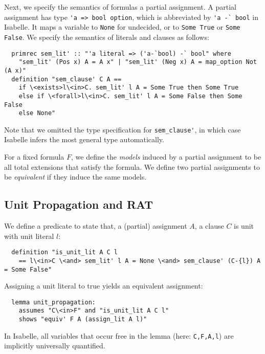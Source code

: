 \documentclass{llncs}
\newcommand{\isai}{\lstinline[language=isabelle,basicstyle=\normalsize\ttfamily\slshape]}
\begin{document}
Next, we specify the semantics of formulas \wrt a partial assignment. A partial assignment has 
type \isai{'a => bool option}, which is abbreviated by \isai{'a -` bool} in Isabelle. 
It maps a variable to \isai{None} for undecided, or to \isai{Some True} or \isai{Some False}.
We specify the semantics of literals and clauses as follows:
\begin{lstlisting}
  primrec sem_lit' :: "'a literal => ('a-`bool) -` bool" where
    "sem_lit' (Pos x) A = A x" | "sem_lit' (Neg x) A = map_option Not (A x)"
  definition "sem_clause' C A ==
    if \<exists>l\<in>C. sem_lit' l A = Some True then Some True
    else if \<forall>l\<in>C. sem_lit' l A = Some False then Some False
    else None"
\end{lstlisting}
Note that we omitted the type specification for \isai{sem_clause'}, in which case Isabelle infers the most general type automatically.

For a fixed formula $F$, we define the \emph{models} induced by a partial assignment to be all total extensions that satisfy the formula. 
We define two partial assignments to be \emph{equivalent} if they induce the same models.

\subsection{Unit Propagation and RAT}
We define a predicate to state that, \wrt a (partial) assignment $A$, a clause $C$ is unit with unit literal $l$:
\begin{lstlisting}
  definition "is_unit_lit A C l 
    == l\<in>C \<and> sem_lit' l A = None \<and> sem_clause' (C-{l}) A = Some False"
\end{lstlisting}
Assigning a unit literal to true yields an equivalent assignment:
\begin{lstlisting}
  lemma unit_propagation:
    assumes "C\<in>F" and "is_unit_lit A C l"
    shows "equiv' F A (assign_lit A l)"
\end{lstlisting}
In Isabelle, all variables that occur free in the lemma (here: \isai{C,F,A,l}) are implicitly universally quantified.
\end{document}
